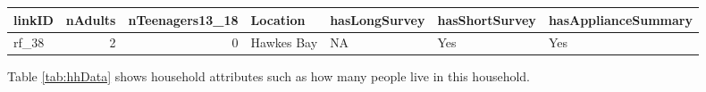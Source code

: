 \documentclass[]{article}
\theoremstyle{definition}
\theoremstyle{definition}
\theoremstyle{definition}
\theoremstyle{remark}
\begin{document}
\begin{longtable}[]{@{}lrrllll@{}}
\toprule
\begin{minipage}[b]{0.07\columnwidth}\raggedright\strut
linkID\strut
\end{minipage} & \begin{minipage}[b]{0.07\columnwidth}\raggedleft\strut
nAdults\strut
\end{minipage} & \begin{minipage}[b]{0.14\columnwidth}\raggedleft\strut
nTeenagers13\_18\strut
\end{minipage} & \begin{minipage}[b]{0.10\columnwidth}\raggedright\strut
Location\strut
\end{minipage} & \begin{minipage}[b]{0.12\columnwidth}\raggedright\strut
hasLongSurvey\strut
\end{minipage} & \begin{minipage}[b]{0.13\columnwidth}\raggedright\strut
hasShortSurvey\strut
\end{minipage} & \begin{minipage}[b]{0.17\columnwidth}\raggedright\strut
hasApplianceSummary\strut
\end{minipage}\tabularnewline
\midrule
\endhead
\begin{minipage}[t]{0.07\columnwidth}\raggedright\strut
rf\_38\strut
\end{minipage} & \begin{minipage}[t]{0.07\columnwidth}\raggedleft\strut
2\strut
\end{minipage} & \begin{minipage}[t]{0.14\columnwidth}\raggedleft\strut
0\strut
\end{minipage} & \begin{minipage}[t]{0.10\columnwidth}\raggedright\strut
Hawkes Bay\strut
\end{minipage} & \begin{minipage}[t]{0.12\columnwidth}\raggedright\strut
NA\strut
\end{minipage} & \begin{minipage}[t]{0.13\columnwidth}\raggedright\strut
Yes\strut
\end{minipage} & \begin{minipage}[t]{0.17\columnwidth}\raggedright\strut
Yes\strut
\end{minipage}\tabularnewline
\bottomrule
\end{longtable}

Table \ref{tab:hhData} shows household attributes such as how many
people live in this household.
\end{document}
